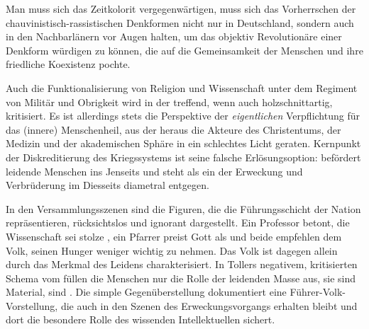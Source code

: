 \begin{BlockQuote}
  Man muss sich das Zeitkolorit vergegenwärtigen, muss sich das Vorherrschen der
  chauvinistisch-rassistischen Denkformen nicht nur in Deutschland, sondern auch
  in den Nachbarlänern vor Augen halten, um das objektiv Revolutionäre einer
  Denkform würdigen zu können, die auf die Gemeinsamkeit der Menschen und ihre
  friedliche Koexistenz pochte.
\end{BlockQuote}
Auch die Funktionalisierung von Religion und Wissenschaft unter dem Regiment
von Militär und Obrigkeit wird in der  treffend, wenn auch
holzschnittartig, kritisiert.
Es ist allerdings stets die Perspektive der \emph{eigentlichen} Verpflichtung für das
(innere) Menschenheil, aus der heraus die Akteure des Christentums, der
Medizin und der akademischen Sphäre in ein schlechtes Licht geraten. Kernpunkt
der Diskreditierung des Kriegssystems ist seine falsche Erlösungsoption:
\Cite{Der Tod als Feind des Geistes} befördert leidende Menschen ins Jenseits
und steht als ein \Cite{das Individuum wie die Gesamtkultur zerstörender
  Prozeß} der Erweckung und Verbrüderung im
Diesseits diametral entgegen. 

In den Versammlungsszenen sind die Figuren, die die Führungsschicht der Nation
repräsentieren, rücksichtslos und ignorant dargestellt. Ein Professor betont,
die Wissenschaft sei stolze \Cite{Dienerin unseres Staates}
, ein Pfarrer preist Gott als \Cite{Herr[n] der Heerscharen}
 und beide empfehlen dem Volk,
seinen Hunger weniger wichtig zu nehmen. Das Volk ist dagegen allein durch das
Merkmal des Leidens charakterisiert. In Tollers negativem, kritisierten Schema
vom \Cite{Vaterland} füllen die Menschen nur die Rolle der leidenden Masse
aus, sie sind Material, sind \Cite{Vieh}. Die simple Gegenüberstellung
dokumentiert eine Führer-Volk-Vorstellung, die auch in den Szenen des
Erweckungsvorgangs erhalten bleibt und dort die besondere Rolle des wissenden
Intellektuellen sichert.


